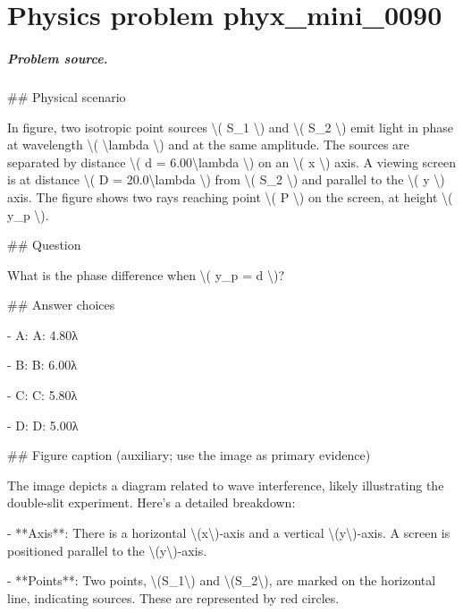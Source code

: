 
\chapter{Physics problem phyx\_mini\_0090}
\label{ch:PhyXMiniProblems_problem_phyx_mini_0090}

\paragraph{Problem source.}
\#\# Physical scenario

In figure, two isotropic point sources \textbackslash{}( S\_1 \textbackslash{}) and \textbackslash{}( S\_2 \textbackslash{}) emit light in phase at wavelength \textbackslash{}( \textbackslash{}lambda \textbackslash{}) and at the same amplitude. The sources are separated by distance \textbackslash{}( d = 6.00\textbackslash{}lambda \textbackslash{}) on an \textbackslash{}( x \textbackslash{}) axis. A viewing screen is at distance \textbackslash{}( D = 20.0\textbackslash{}lambda \textbackslash{}) from \textbackslash{}( S\_2 \textbackslash{}) and parallel to the \textbackslash{}( y \textbackslash{}) axis. The figure shows two rays reaching point \textbackslash{}( P \textbackslash{}) on the screen, at height \textbackslash{}( y\_p \textbackslash{}).

\#\# Question

What is the phase difference when \textbackslash{}( y\_p = d \textbackslash{})?

\#\# Answer choices

- A: A: 4.80λ

- B: B: 6.00λ

- C: C: 5.80λ

- D: D: 5.00λ

\#\# Figure caption (auxiliary; use the image as primary evidence)

The image depicts a diagram related to wave interference, likely illustrating the double-slit experiment. Here's a detailed breakdown:

- **Axis**: There is a horizontal \textbackslash{}(x\textbackslash{})-axis and a vertical \textbackslash{}(y\textbackslash{})-axis. A screen is positioned parallel to the \textbackslash{}(y\textbackslash{})-axis.

- **Points**: Two points, \textbackslash{}(S\_1\textbackslash{}) and \textbackslash{}(S\_2\textbackslash{}), are marked on the horizontal line, indicating sources. These are represented by red circles.

